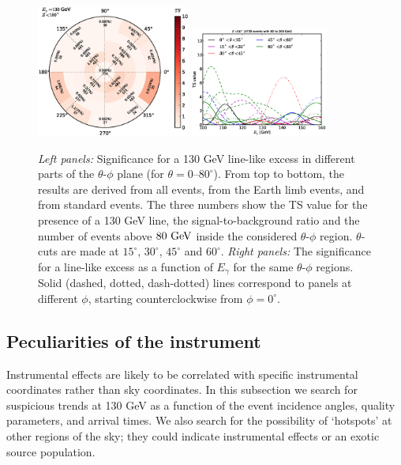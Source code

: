\documentclass[aps,twocolumn,prd,superscriptaddress,showpacs,nofootinbib,fixfloat]{revtex4}
\newcommand{\GeV}{{\rm ~GeV}}
\begin{document}
\begin{figure}
  \includegraphics[width=0.45\textwidth]{plots/polar_z.LE.100.eps}
  \includegraphics[width=0.40\textwidth]{plots/scan_z.LE.100.eps}
  \caption{\emph{Left panels:} Significance for a 130 GeV
  line-like excess in different parts of the $\theta$-$\phi$
  plane (for $\theta=0$--$80^\circ$). From top to bottom,
  the results are derived from all events, from the Earth
  limb events, and from standard events. The three numbers
  show the TS value for the presence of a 130 GeV line, the
  signal-to-background ratio and the number of events above
  $80\GeV$ inside the considered $\theta$-$\phi$ region.
  $\theta$-cuts are made at $15^\circ$, $30^\circ$, $45^\circ$ and $60^\circ$.
  \emph{Right panels:} The significance for a
  line-like excess as a function of $E_\gamma$ for the same $\theta$-$\phi$ regions.
  Solid (dashed, dotted, dash-dotted) lines correspond to panels at different
  $\phi$, starting counterclockwise from $\phi=0^\circ$.
  }
  \label{fig:polarPlotsAll}
\end{figure}


\subsection{Peculiarities of the instrument}
Instrumental effects are likely to be correlated with specific instrumental
coordinates rather than sky coordinates. In this subsection we search for
suspicious trends at 130 GeV as a function of the event incidence angles,
quality parameters, and arrival times.  We also search for the possibility of
`hotspots' at other regions of the sky; they could indicate instrumental
effects or an exotic source population.
\end{document}
